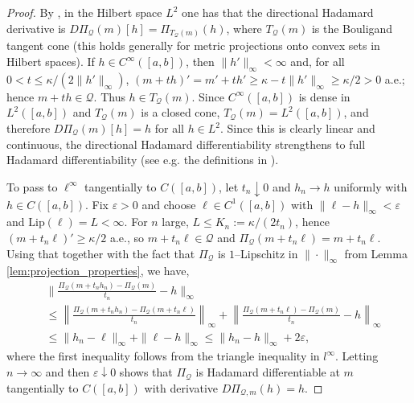 \documentclass[12pt]{article}
\begin{document}
\begin{proof}
By \cite{zarantonello1971projections}, in the Hilbert space $L^2$ one has that the directional Hadamard derivative is
$D\Pi_{\mathcal Q}(m)[h]=\Pi_{T_{\mathcal Q}(m)}(h)$, where $T_{\mathcal Q}(m)$ is the
Bouligand tangent cone (this holds generally for metric projections onto convex sets in Hilbert spaces). If $h\in C^\infty([a,b])$, then $\|h'\|_\infty<\infty$ and, for all
$0<t\le \kappa/(2\|h'\|_\infty)$,
\(
(m+th)' = m' + t h' \ge \kappa - t\|h'\|_\infty \ge \kappa/2>0
\)
a.e.; hence $m+th\in\mathcal Q$. Thus $h\in T_{\mathcal Q}(m)$. Since $C^\infty([a,b])$ is
dense in $L^2([a,b])$ and $T_{\mathcal Q}(m)$ is a closed cone, $T_{\mathcal Q}(m)=L^2([a,b])$,
and therefore $D\Pi_{\mathcal Q}(m)[h]=h$ for all $h\in L^2$. Since this is clearly linear and continuous, the directional Hadamard differentiability strengthens to full Hadamard differentiability (see e.g. the definitions in \citet{fang2019inference}). 

To pass to $\ell^\infty$ tangentially to $C([a,b])$, let $t_n\downarrow0$ and $h_n\to h$
uniformly with $h\in C([a,b])$. Fix $\varepsilon>0$ and choose $\ell\in C^1([a,b])$ with
$\|\ell-h\|_\infty<\varepsilon$ and $\mathrm{Lip}(\ell)=L<\infty$. For $n$ large,
$L\le K_n:=\kappa/(2t_n)$, hence $(m+t_n\ell)'\ge\kappa/2$ a.e.,
so $m+t_n\ell\in\mathcal Q$ and $\Pi_{\mathcal Q}(m+t_n\ell)=m+t_n\ell$.
Using that together with the fact that $\Pi_{\mathcal Q}$ is $1$–Lipschitz in $\|\cdot\|_\infty$ from Lemma \ref{lem:projection_properties}, we have, 
\begin{align*}
& \Big\|
\frac{\Pi_{\mathcal Q}(m+t_n h_n)-\Pi_{\mathcal Q}(m)}{t_n}-h
\Big\|_\infty
\\ &  \le \left\|\frac{\Pi_{\mathcal{Q}}\left(m+t_n h_n\right)-\Pi_{\mathcal{Q}}\left(m+t_n \ell\right)}{t_n}\right\|_{\infty}+\left\|\frac{\Pi_{\mathcal{Q}}\left(m+t_n \ell\right)-\Pi_{\mathcal{Q}}(m)}{t_n}-h\right\|_{\infty}  \\
& \le
\|h_n-\ell\|_\infty+\|\ell-h\|_\infty
\le
\|h_n-h\|_\infty+2\varepsilon,
\end{align*}
where the first inequality follows from the triangle inequality in $l^\infty$. 
Letting $n\to\infty$ and then $\varepsilon\downarrow0$ shows that
$\Pi_{\mathcal Q}$ is Hadamard differentiable at $m$ tangentially to $C([a,b])$ with
derivative $D \Pi_{\mathcal Q,m}(h)=h$.
\end{proof}
\end{document}
